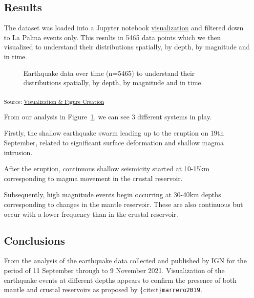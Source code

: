\documentclass[
]{agujournal2019}
\begin{document}
\subsection{Results}\label{results}

The dataset was loaded into a Jupyter notebook
\href{./notebooks/visualization-figure-creation-seaborn.ipynb}{visualization}
and filtered down to La Palma events only. This results in 5465 data
points which we then visualized to understand their distributions
spatially, by depth, by magnitude and in time.

\begin{figure}[H]


\caption{\label{fig-timeline}Earthquake data over time (n=5465) to
understand their distributions spatially, by depth, by magnitude and in
time.}

\end{figure}%

\textsubscript{Source:
\href{https://Notebooks-Now.github.io/submission-quarto-full/notebooks/visualization-figure-creation-seaborn-preview.html\#cell-fig-timeline}{Visualization
\& Figure Creation}}

From our analysis in Figure~\ref{fig-timeline}, we can see 3 different
systems in play.

Firstly, the shallow earthquake swarm leading up to the eruption on 19th
September, related to significant surface deformation and shallow magma
intrusion.

After the eruption, continuous shallow seismicity started at 10-15km
corresponding to magma movement in the crustal reservoir.

Subsequently, high magnitude events begin occurring at 30-40km depths
corresponding to changes in the mantle reservoir. These are also
continuous but occur with a lower frequency than in the crustal
reservoir.

\subsection{Conclusions}\label{conclusions}

From the analysis of the earthquake data collected and published by IGN
for the period of 11 September through to 9 November 2021. Visualization
of the earthquake events at different depths appears to confirm the
presence of both mantle and crustal reservoirs as proposed by
\{cite:t\}\texttt{marrero2019}.
\end{document}
